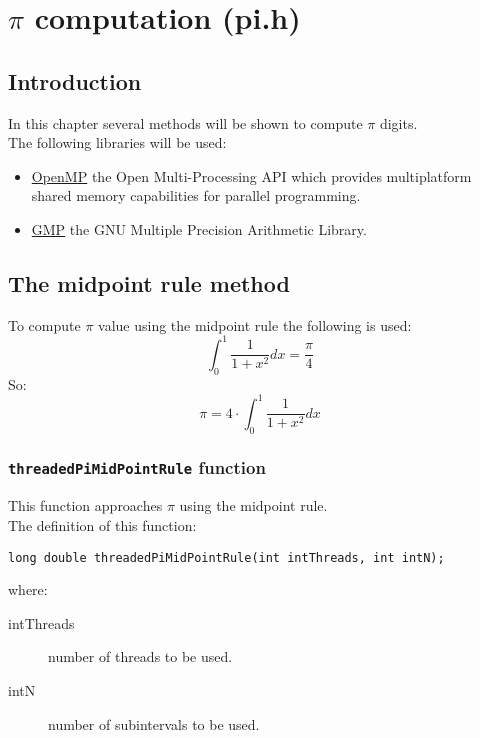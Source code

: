 %
%

\chapter{$\pi$ computation (pi.h)}

\section{Introduction}

In this chapter several methods will be shown to compute $\pi$ digits.\\

The following libraries will be used:
%
\begin{itemize}
\item \href{http://www.openmp.org/}{OpenMP} the Open Multi-Processing API which provides multiplatform shared memory capabilities for parallel programming.
\item \href{https://gmplib.org/}{GMP} the GNU Multiple Precision Arithmetic Library.
\end{itemize}

\section{The midpoint rule method}

To compute $\pi$ value using the midpoint rule the following is used:
%
\begin{displaymath}
\int_0^1 \frac{1}{1+x^2} dx = \frac{\pi}{4}
\end{displaymath}
%
So:
%
\begin{displaymath}
\pi = 4 \cdot \int_0^1 \frac{1}{1+x^2} dx
\end{displaymath}

\subsection{\texttt{threadedPiMidPointRule} function}

This function approaches $\pi$ using the midpoint rule.\\

The definition of this function:
%
\begin{verbatim}
long double threadedPiMidPointRule(int intThreads, int intN);  
\end{verbatim}
%
where:
%
\begin{description}
\item[intThreads] number of threads to be used.
\item[intN] number of subintervals to be used.
\end{description}

